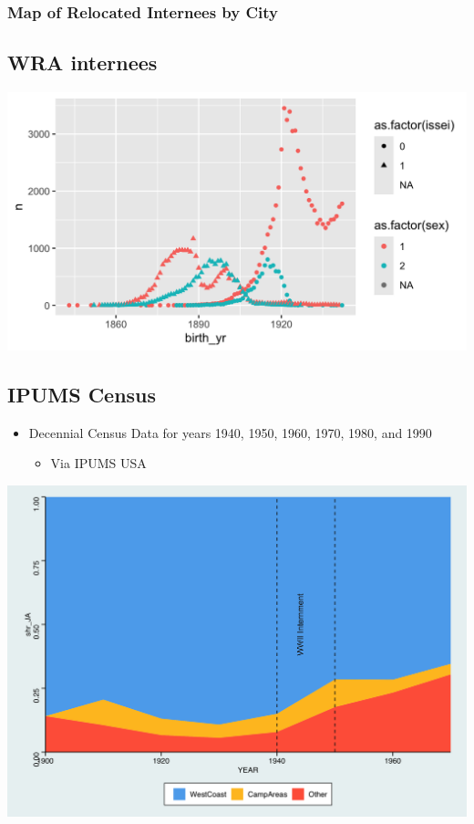 \documentclass[12pt]{article}
\begin{document}
\subsubsection{Map of Relocated Internees by City}
\label{map-of-relocated-internees-by-city}

\subsection{WRA internees}\label{wra-internees}

\includegraphics[width=1.0\textwidth]{figures/wra-internee-cohorts.png}

\subsection{IPUMS Census}\label{ipums-census}

\begin{itemize}

\item
  Decennial Census Data for years 1940, 1950, 1960, 1970, 1980, and 1990

  \begin{itemize}
  
  \item
    Via IPUMS USA \citep{ruggles_ipums_2024}
  \end{itemize}
\end{itemize}

\includegraphics[width=1.0\textwidth]{figures/shareareaplot.png}
\end{document}
